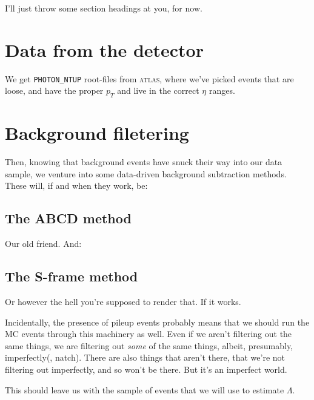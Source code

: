 I'll just throw some section headings at you, for now.

\section{Data from the detector}
We get \texttt{PHOTON_NTUP} root-files from \textsc{atlas}, where we've picked events that are loose, and have the proper $p_T$ and live in the correct $\eta$ ranges.

\section{Background filetering}
Then, knowing that background events have snuck their way into our data sample, we venture into some data-driven background subtraction methods. These will, if and when they work, be:

\subsection{The ABCD method}
Our old friend. And:

\subsection{The S-frame method}
Or however the hell you're supposed to render that. If it works.

Incidentally, the presence of pileup events probably means that we should run the MC events through this machinery as well. Even if we aren't filtering out the same things, we are filtering out \textit{some} of the same things, albeit, presumably, imperfectly(, natch). There are also things that aren't there, that we're not filtering out imperfectly, and so won't be there. But it's an imperfect world.

This should leave us with the sample of events that we will use to estimate $\Lambda$.
